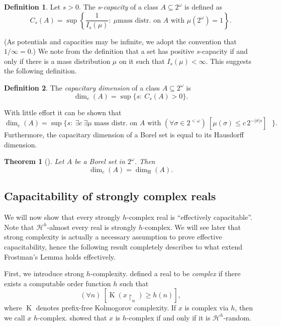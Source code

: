 \documentclass[11pt,reqno]{article}
\theoremstyle{plain}
\newtheorem{thm}{Theorem}
\theoremstyle{definition}
\newtheorem{defn}{Definition}
\theoremstyle{remark}
\numberwithin{equation}{section}
\newcommand{\Cant}{\ensuremath{2^{\omega}}}
\newcommand{\Str}[1][<\omega]{\ensuremath{2^{#1}}}
\newcommand{\Cl}[1]{\ensuremath{#1}}
\newcommand{\Subcl}[1]{\ensuremath{\Cl{#1} \subseteq \Cant}}
\newcommand{\Rest}[1]{\ensuremath{\!\restriction_{#1}}}
\newcommand{\Hmeas}{\ensuremath{\mathcal{H}}}
\newcommand{\Hm}[1]{\ensuremath{\Hmeas^{#1}}}
\newcommand{\Hdim}[1][\mbox{}]{\ensuremath{\dim^{#1}_{\operatorname{H}}}}
\DeclareMathOperator{\K}{K}
\begin{document}
%
%
\begin{defn}\label{cant:def_capac}
Let $s > 0$. The $s$-\emph{capacity} of a class $\Subcl{A}$ is defined as
\[
        C_s(\Cl{A}) = \sup \left\{ \frac{1}{I_s(\mu)}: \: \mu \text{
            mass distr. on $\Cl{A}$ with $\mu(\Cant) = 1$} \right\}.
\]
\end{defn}

(As potentials and capacities may be infinite, we adopt the convention
that $1/\infty = 0$.) We note from the definition that a set has
positive $s$-capacity if and only if there is a mass distribution
$\mu$ on it such that $I_s(\mu) < \infty$. This suggests the following
definition. 

%
%
\begin{defn}\label{cant:def_capdim}
The \emph{capacitary dimension} of a class $\Subcl{A}$ is
\[
        \dim_c(\Cl{A}) = \sup \{ s: \: C_s(\Cl{A}) > 0 \}.
\]
\end{defn}
With little effort it can be shown that 
\[
        \dim_c(\Cl{A}) = \sup \{ s: \: \exists c\: \exists \mu \text{ mass
          distr. on $\Cl{A}$ with $(\forall \sigma \in \Str)\:[\mu(\sigma) \leq c\,2^{-|\sigma|s}]$ } \}. 
\]
Furthermore, the capacitary dimension of a Borel set is equal to its
Hausdorff dimension. 

%
%
\begin{thm}[\citet{frostman:1935}] \label{cant:thm_cdimeqhdim}
Let $\Cl{A}$ be a Borel set in $\Cant$. Then
\[
        \dim_c(\Cl{A}) = \Hdim(\Cl{A}).
\]
\end{thm}



% 
% 
\subsection{Capacitability of strongly complex reals} \label{ssec-cap-eff-closed}

We will now show that every strongly ${h}$-complex real is ``effectively capacitable''. Note that $\Hm{h}$-almost every real is strongly $h$-complex. We will see later that strong complexity is actually a necessary assumption to prove effective capacitability, hence the following result completely describes to what extend Frostman's Lemma holds effectively.

First, we introduce strong $h$-complexity. \citet{kjos-hanssen-merkle-stephan:2006} defined a real to be \emph{complex} if there exists a computable order function $h$ such that 
\begin{equation}\label{equ-complex}
	(\forall n)\: [ \K(x\Rest{n}) \geq h(n)],
\end{equation}
where $\K$ denotes prefix-free Kolmogorov complexity.
If $x$ is complex via $h$, then we call $x$ $h$-complex. \citet{reimann:2004} showed that $x$ is $h$-complex if and only if it is $\Hm{h}$-random.
\end{document}
